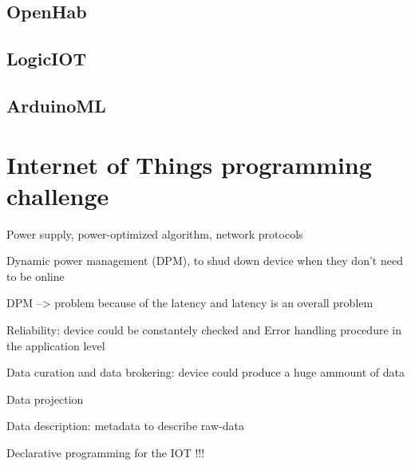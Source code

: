 \subsection{OpenHab}
\label{subsec:openhab}

\subsection{LogicIOT}
\label{subsec:logic-iot}

\subsection{ArduinoML}
\label{subsec:arduino-ml}

\section{Internet of Things programming challenge}
\label{sec:iot-prog-challenge}

Power supply, power-optimized algorithm, network protocols

Dynamic power management (DPM), to shud down device when they don’t need to be
online

DPM --> problem because of the latency and latency is an overall problem

Reliability: device could be constantely checked and Error handling procedure
in the application level

Data curation and data brokering: device could produce a huge ammount of data

Data projection

Data description: metadata to describe raw-data

Declarative programming for the IOT !!!

